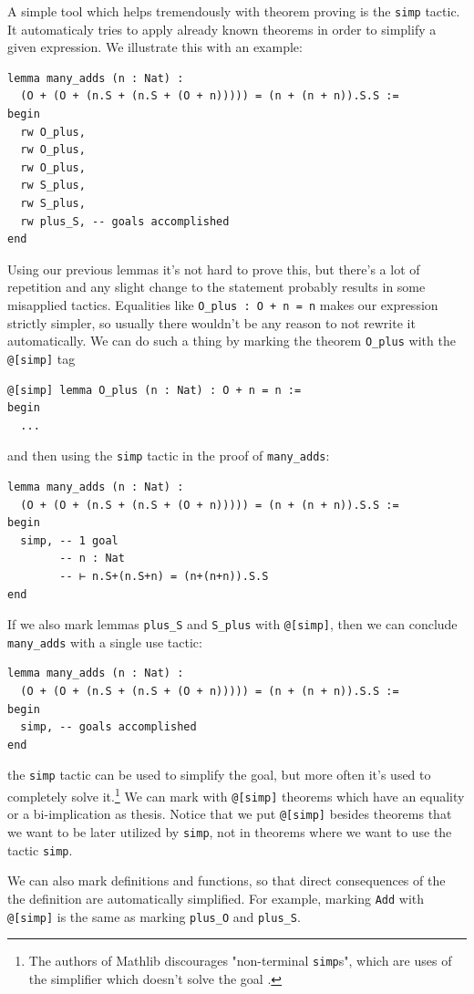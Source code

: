 \documentclass[oneside]{book}
\theoremstyle{definition}
\theoremstyle{remark}
\theoremstyle{plain}
\begin{document}
A simple tool which helps tremendously with theorem proving is the \lstinline{simp} tactic.
It automaticaly tries to apply already known theorems in order to simplify a given expression.
We illustrate this with an example:
\begin{lstlisting}
lemma many_adds (n : Nat) :
  (O + (O + (n.S + (n.S + (O + n))))) = (n + (n + n)).S.S :=
begin
  rw O_plus,
  rw O_plus,
  rw O_plus,
  rw S_plus,
  rw S_plus,
  rw plus_S, -- goals accomplished
end
\end{lstlisting}
Using our previous lemmas it's not hard to prove this,
but there's a lot of repetition and any slight change to the statement probably results in some misapplied tactics.
Equalities like \lstinline{O_plus : O + n = n} makes our expression strictly simpler,
so usually there wouldn't be any reason to not rewrite it automatically.
We can do such a thing by marking the theorem \lstinline{O_plus} with the \lstinline{@[simp]} tag
\begin{lstlisting}
@[simp] lemma O_plus (n : Nat) : O + n = n :=
begin
  ...  
\end{lstlisting}
and then using the \lstinline{simp} tactic in the proof of \lstinline{many_adds}:
\begin{lstlisting}
lemma many_adds (n : Nat) :
  (O + (O + (n.S + (n.S + (O + n))))) = (n + (n + n)).S.S :=
begin
  simp, -- 1 goal
        -- n : Nat
        -- ⊢ n.S+(n.S+n) = (n+(n+n)).S.S
end
\end{lstlisting}
If we also mark lemmas \lstinline{plus_S} and \lstinline{S_plus} with \lstinline{@[simp]},
then we can conclude \lstinline{many_adds} with a single use tactic:
\begin{lstlisting}
lemma many_adds (n : Nat) :
  (O + (O + (n.S + (n.S + (O + n))))) = (n + (n + n)).S.S :=
begin
  simp, -- goals accomplished
end  
\end{lstlisting}
the \lstinline{simp} tactic can be used to simplify the goal,
but more often it's used to completely solve it.\footnote{The authors of Mathlib discourages
"non-terminal \lstinline{simp}s", which are uses of the simplifier which doesn't solve the goal \cite{mathlibsimp}.}
We can mark with \lstinline{@[simp]} theorems which have an equality or a bi-implication as thesis.
Notice that we put \lstinline{@[simp]} besides theorems that we want to be later utilized by \lstinline{simp},
not in theorems where we want to use the tactic \lstinline{simp}.

We can also mark definitions and functions,
so that direct consequences of the the definition are automatically simplified.
For example, marking \lstinline{Add} with \lstinline{@[simp]} is the same as marking \lstinline{plus_O} and \lstinline{plus_S}. 
\end{document}
